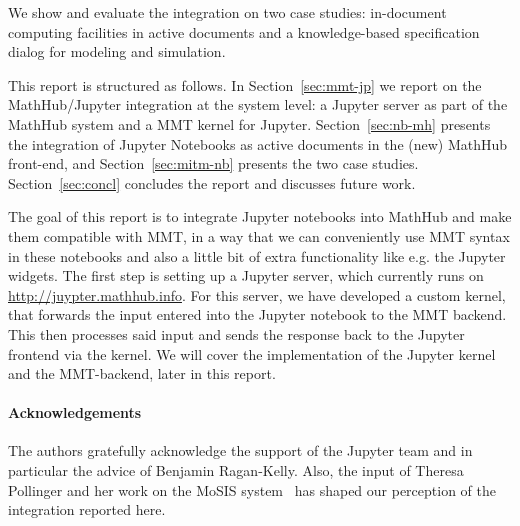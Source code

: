 We show and evaluate the integration on two case studies: in-document computing facilities in active documents and a knowledge-based specification dialog for modeling and simulation. 

This report is structured as follows. In Section~\ref{sec:mmt-jp} we report on the MathHub/Jupyter integration at the system level: a Jupyter server as part of the MathHub system and a MMT kernel for Jupyter. Section~\ref{sec:nb-mh} presents the integration of Jupyter Notebooks as active documents in the (new) MathHub front-end, and Section~\ref{sec:mitm-nb} presents the two case studies. Section~\ref{sec:concl} concludes the report and discusses future work.


The goal of this report is to integrate Jupyter notebooks into MathHub
and make them compatible with MMT, in a way that we can conveniently use 
MMT syntax in these notebooks and also a little bit of extra functionality
like e.g. the Jupyter widgets. The first step is setting up a Jupyter server,
which currently runs on \url{http://juypter.mathhub.info}. 
For this server, we have developed a custom kernel, that forwards the input 
entered into the Jupyter notebook to the MMT backend. This then processes 
said input and sends the response back to the Jupyter frontend via the kernel.
We will cover the implementation of the Jupyter kernel and the MMT-backend,
later in this report.


\paragraph{Acknowledgements} The authors gratefully acknowledge the support of the Jupyter team and in particular the advice of Benjamin Ragan-Kelly. Also, the input of Theresa Pollinger and her work on the MoSIS system~\cite{PolKohKoe:kacse18} has shaped our perception of the integration reported here. 


